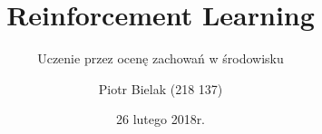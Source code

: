 \documentclass{beamer}
\title[Reinforcement Learning]{Reinforcement Learning}
\subtitle{Uczenie przez ocenę zachowań w środowisku}
\author[Piotr Bielak]{Piotr Bielak (218 137)}
\institute[W8, PWr]
{Wydział Informatyki i Zarządzania\\Politechnika Wrocławska}
\date{26 lutego 2018r.}
\begin{document}
  \titlepage

  
  
  
  

  \titlepage
\end{document}
